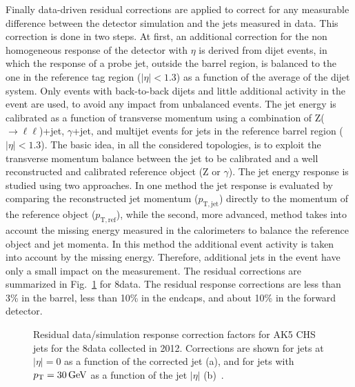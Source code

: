 Finally data-driven residual corrections are applied to correct for any measurable difference between the detector simulation and the jets measured in data. 
This correction is done in two steps. At first, an additional correction for the non homogeneous response of the detector with $\eta$ is derived from dijet events, in which the \pt response of a probe jet, outside the barrel region, is balanced to the one in the reference tag region ($|\eta| < 1.3$) as a function of the average \pt of the dijet system. Only events with back-to-back dijets and little additional activity in the event are used, to avoid any impact from unbalanced events. %
The jet energy is calibrated as a function of transverse momentum using a combination of Z($\to\ell\ell$)+jet, $\gamma$+jet, and multijet events for jets in the reference barrel region ($|\eta| < 1.3$). The basic idea, in all the considered topologies, is to exploit the transverse momentum balance between the jet to be calibrated and a well reconstructed and calibrated reference object (Z or $\gamma$). The jet energy response is studied using two approaches. In one method the jet response is evaluated by comparing the reconstructed jet momentum ($p_\mathrm{T,jet}$) directly to the momentum of the reference object ($p_\mathrm{T,ref}$), while the second, more advanced, method takes into account the missing energy measured in the calorimeters to balance the reference object and jet momenta. In this method the additional event activity is taken into account by the missing energy. Therefore, additional jets in the event have only a small impact on the measurement. The residual corrections are summarized in Fig.~\ref{fig:rescorr_ak5chs} for 8\TeV data. The residual response corrections are less than 3\% in the barrel, less than 10\% in the endcaps, and about 10\% in the forward detector.

\begin{figure}[!htb]
\centering
{}
\caption{Residual data/simulation response correction factors for AK5 CHS jets for the 8\TeV data collected in 2012. Corrections are shown for jets at $|\eta| = 0$ as a function of the corrected jet \pt (a), and for jets with $p_{\mathrm{T}} = 30\,\text{Ge\hspace{-.08em}V}$ as a function of the jet $|\eta|$ (b)~\cite{Khachatryan:2016kdb}.}
\label{fig:rescorr_ak5chs}
\end{figure}

